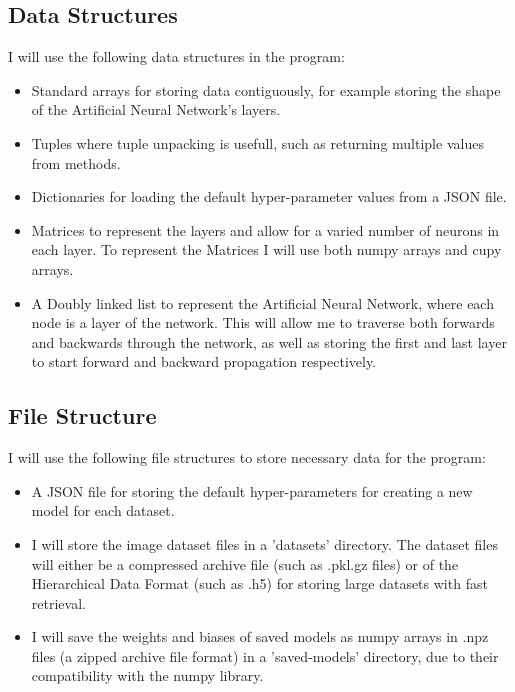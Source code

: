 \documentclass[./project-report/src/latex/project-report.tex]{subfiles}
\begin{document}
\subsection{Data Structures}

I will use the following data structures in the program:

\begin{itemize}
    \item Standard arrays for storing data contiguously, for example storing the shape of the Artificial Neural Network's layers.
    \item Tuples where tuple unpacking is usefull, such as returning multiple values from methods.
    \item Dictionaries for loading the default hyper-parameter values from a JSON file.
    \item Matrices to represent the layers and allow for a varied number of neurons in each layer. To represent the Matrices I will use both numpy arrays and cupy 
          arrays.
    \item A Doubly linked list to represent the Artificial Neural Network, where each node is a layer of the network. This will allow me to traverse both forwards and 
          backwards through the network, as well as storing the first and last layer to start forward and backward propagation respectively.
\end{itemize}

\subsection{File Structure}

I will use the following file structures to store necessary data for the program:

\begin{itemize}
    \item A JSON file for storing the default hyper-parameters for creating a new model for each dataset.
    \item I will store the image dataset files in a 'datasets' directory. The dataset files will either be a compressed archive file (such as .pkl.gz files) or of the 
          Hierarchical Data Format (such as .h5) for storing large datasets with fast retrieval.
    \item I will save the weights and biases of saved models as numpy arrays in .npz files (a zipped archive file format) in a 'saved-models' directory, due to 
          their compatibility with the numpy library.
\end{itemize}
\end{document}
